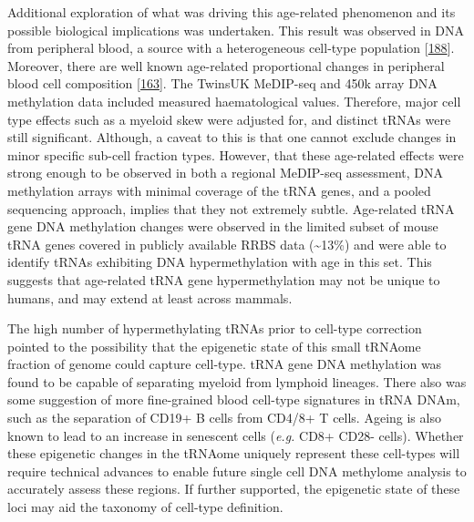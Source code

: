 \documentclass[
]{book}
\begin{document}
Additional exploration of what was driving this age-related phenomenon and its possible biological implications was undertaken.
This result was observed in DNA from peripheral blood, a source with a heterogeneous cell-type population {[}\protect\hyperlink{ref-Lappalainen2017}{188}{]}.
Moreover, there are well known age-related proportional changes in peripheral blood cell composition {[}\protect\hyperlink{ref-Geiger2013}{163}{]}.
The TwinsUK MeDIP-seq and 450k array DNA methylation data included measured haematological values.
Therefore, major cell type effects such as a myeloid skew were adjusted for, and distinct tRNAs were still significant.
Although, a caveat to this is that one cannot exclude changes in minor specific sub-cell fraction types.
However, that these age-related effects were strong enough to be observed in both a regional MeDIP-seq assessment, DNA methylation arrays with minimal coverage of the tRNA genes, and a pooled sequencing approach, implies that they not extremely subtle.
Age-related tRNA gene DNA methylation changes were observed in the limited subset of mouse tRNA genes covered in publicly available RRBS data (\textasciitilde13\%) and were able to identify tRNAs exhibiting DNA hypermethylation with age in this set.
This suggests that age-related tRNA gene hypermethylation may not be unique to humans, and may extend at least across mammals.

The high number of hypermethylating tRNAs prior to cell-type correction pointed to the possibility that the epigenetic state of this small tRNAome fraction of genome could capture cell-type.
tRNA gene DNA methylation was found to be capable of separating myeloid from lymphoid lineages.
There also was some suggestion of more fine-grained blood cell-type signatures in tRNA DNAm, such as the separation of CD19+ B cells from CD4/8+ T cells.
Ageing is also known to lead to an increase in senescent cells (\emph{e.g.} CD8+ CD28- cells).
Whether these epigenetic changes in the tRNAome uniquely represent these cell-types will require technical advances to enable future single cell DNA methylome analysis to accurately assess these regions.
If further supported, the epigenetic state of these loci may aid the taxonomy of cell-type definition.
\end{document}
